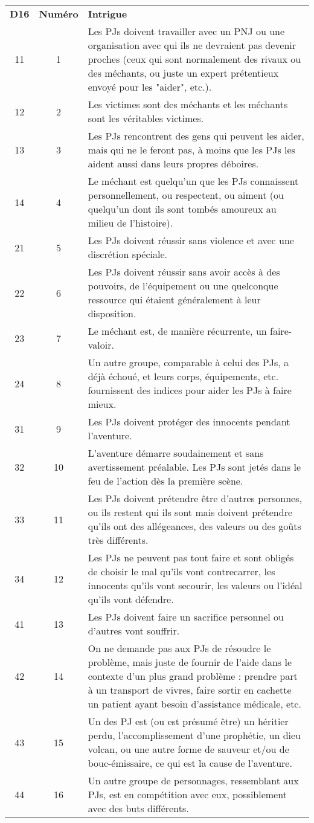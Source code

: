\begin{center}
\begin{tabular}{ccp{12cm}}
\textbf{D16} & \textbf{Numéro} & \textbf{Intrigue} \\
11 & 1 & Les PJs doivent travailler avec un PNJ ou une organisation avec qui ils ne devraient pas devenir proches (ceux qui sont normalement des rivaux ou des méchants, ou juste un expert prétentieux envoyé pour les "aider", etc.). \\
12 & 2 & Les victimes sont des méchants et les méchants sont les véritables victimes. \\
13 & 3 & Les PJs rencontrent des gens qui peuvent les aider, mais qui ne le feront pas, à moins que les PJs les aident aussi dans leurs propres déboires. \\
14 & 4 & Le méchant est quelqu'un que les PJs connaissent personnellement, ou respectent, ou aiment (ou quelqu'un dont ils sont tombés amoureux au milieu de l'histoire). \\
21 & 5 & Les PJs doivent réussir sans violence et avec une discrétion spéciale. \\
22 & 6 & Les PJs doivent réussir sans avoir accès à des pouvoirs, de l'équipement ou une quelconque ressource qui étaient généralement à leur disposition. \\
23 & 7 & Le méchant est, de manière récurrente, un faire-valoir. \\
24 & 8 & Un autre groupe, comparable à celui des PJs, a déjà échoué, et leurs corps, équipements, etc. fournissent des indices pour aider les PJs à faire mieux. \\
31 & 9 & Les PJs doivent protéger des innocents pendant l'aventure. \\
32 & 10 & L'aventure démarre soudainement et sans avertissement préalable. Les PJs sont jetés dans le feu de l'action dès la première scène. \\
33 & 11 & Les PJs doivent prétendre être d'autres personnes, ou ils restent qui ils sont mais doivent prétendre qu'ils ont des allégeances, des valeurs ou des goûts très différents.  \\
34 & 12 & Les PJs ne peuvent pas tout faire et sont obligés de choisir le mal qu'ils vont contrecarrer, les innocents qu'ils vont secourir, les valeurs ou l'idéal qu'ils vont défendre. \\
41 & 13 & Les PJs doivent faire un sacrifice personnel ou d'autres vont souffrir. \\
42 & 14 & On ne demande pas aux PJs de résoudre le problème, mais juste de fournir de l'aide dans le contexte d'un plus grand problème : prendre part à un transport de vivres, faire sortir en cachette un patient ayant besoin d'assistance médicale, etc. \\
43 & 15 & Un des PJ est (ou est présumé être) un héritier perdu, l'accomplissement d'une prophétie, un dieu volcan, ou une autre forme de sauveur et/ou de bouc-émissaire, ce qui est la cause de l'aventure. \\
44 & 16 & Un autre groupe de personnages, ressemblant aux PJs, est en compétition avec eux, possiblement avec des buts différents. \\
\end{tabular}
\end{center}
